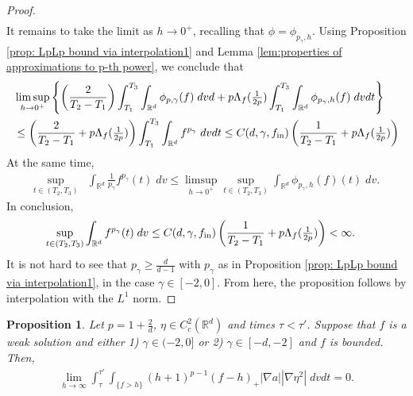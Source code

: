 \documentclass[12pt,american]{amsart}
\numberwithin{equation}{section}
\theoremstyle{plain}
\newtheorem{prop}[thm]{Proposition}
\theoremstyle{definition}                  %
\def\fin{f_{\textnormal{in}}}
\begin{document}
\begin{proof}
\begin{align*}
    \end{align*}
  It remains to take the limit as $h\to 0^+$, recalling that $\phi = \phi_{p_\gamma,h}$. Using Proposition \ref{prop: LpLp bound via interpolation1} and Lemma \ref{lem:properties of approximations to p-th power}, we conclude that 
  \begin{align*}
    & \limsup \limits_{h\to 0^+} \left \{ \left( \frac{2}{T_2-T_1} \right)\int_{T_1}^{T_3}\int_{\mathbb{R}^d}\phi_{p,\gamma}(f)\;dvd+p\Lambda_f(\tfrac{1}{2p})\int_{T_1}^{T_3}\int_{\mathbb{R}^d} \phi_{p_\gamma,h}(f)\;dvdt  \right \} \\
    & \leq \left ( \frac{2}{T_2-T_1}+p\Lambda_{f}(\tfrac{1}{2p})\right ) \int_{T_1}^{T_3} \int_{\mathbb{R}^d}f^{p_\gamma}\;dvdt \leq C(d,\gamma,\fin)  \left ( \frac{1}{T_2-T_1}+p\Lambda_{f}(\tfrac{1}{2p})\right ) 
  \end{align*}
  At the same time, 
  \begin{align*}
    \sup_{t\in(T_2,T_3)} & \int_{\mathbb{R}^d}\frac{1}{p_\gamma}f^{p_\gamma}(t)\;dv  \leq \limsup\limits_{h\to 0^+} \sup_{t\in(T_2,T_3)}  \int_{\mathbb{R}^d}\phi_{p_\gamma,h}(f)(t)\;dv.
  \end{align*}
  In conclusion, 
  \begin{align*}
    \sup_{t\in(T_2,T_3)} & \int_{\mathbb{R}^d}f^{p_\gamma}(t)\;dv  \leq C(d,\gamma,\fin)  \left ( \frac{1}{T_2-T_1}+p\Lambda_{f}(\tfrac{1}{2p})\right ) < \infty. 
  \end{align*}
  It is not hard to see that $p_\gamma \geq \frac{d}{d-1}$ with $p_\gamma$ as in Proposition \ref{prop: LpLp bound via interpolation1}, in the case $\gamma \in [-2,0]$. From here, the proposition follows by interpolation with the $L^1$ norm. 
  \end{proof}

  \begin{prop}\label{prop:energy inequality negligible term}
    Let $p=1+\tfrac{2}{d}$, $\eta \in C^2_c(\mathbb{R}^d)$ and times $\tau<\tau'$. Suppose that $f$ is a weak solution and either 1) $\gamma \in (-2,0]$ or 2) $\gamma \in [-d,-2]$ and $f$ is bounded.  Then,
    \begin{align*}
      \lim\limits_{h\to\infty}\int_{\tau}^{\tau'}\int_{\{f>h\}}(h+1)^{p-1}(f-h)_+|\nabla a||\nabla \eta^2|\;dvdt = 0.
    \end{align*}

  \end{prop}
\end{document}
